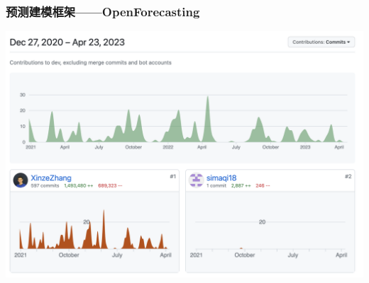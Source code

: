 \begin{frame}
    \frametitle{预测建模框架——OpenForecasting}
    \centering
    \includegraphics[width = 0.83\linewidth]{float/ch.univ/code2.png}

\end{frame}